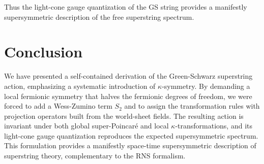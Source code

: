 \documentclass[12pt]{article}
\begin{document}
Thus the light-cone gauge quantization of the GS string provides a manifestly supersymmetric description of the free superstring spectrum.

\section{Conclusion}

We have presented a self-contained derivation of the Green-Schwarz superstring action, emphasizing a systematic introduction of $\kappa$-symmetry. By demanding a local fermionic symmetry that halves the fermionic degrees of freedom, we were forced to add a Wess-Zumino term $S_2$ and to assign the transformation rules with projection operators built from the world-sheet fields. The resulting action is invariant under both global super-Poincar\'e and local $\kappa$-transformations, and its light-cone gauge quantization reproduces the expected supersymmetric spectrum. This formulation provides a manifestly space-time supersymmetric description of superstring theory, complementary to the RNS formalism.
\end{document}
